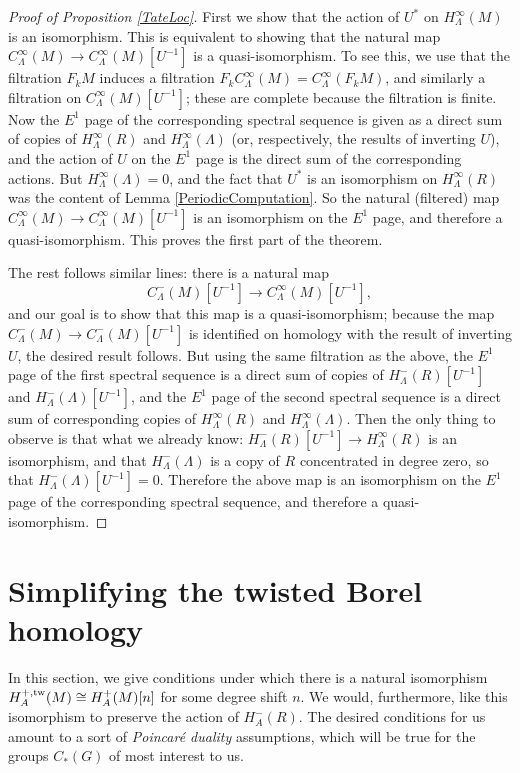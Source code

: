 \documentclass{memo-l}
\theoremstyle{definition}
\theoremstyle{remark}
\numberwithin{section}{chapter}
\numberwithin{equation}{chapter}
\begin{document}
\begin{proof}[Proof of Proposition \ref{TateLoc}]First we show that the action of $U^*$ on $H^\infty_\Lambda(M)$ is an isomorphism. This is equivalent to showing that the natural map $C^\infty_\Lambda(M) \to C^\infty_\Lambda(M)[U^{-1}]$ is a quasi-isomorphism. To see this, we use that the filtration $F_k M$ induces a filtration $F_k C^\infty_\Lambda(M) = C^\infty_\Lambda(F_k M)$, and similarly a filtration on $C^\infty_\Lambda(M)[U^{-1}]$; these are complete because the filtration is finite. Now the $E^1$ page of the corresponding spectral sequence is given as a direct sum of copies of $H^\infty_\Lambda(R)$ and $H^\infty_\Lambda(\Lambda)$ (or, respectively, the results of inverting $U$), and the action of $U$ on the $E^1$ page is the direct sum of the corresponding actions. But $H^\infty_\Lambda(\Lambda) = 0$, and the fact that $U^*$ is an isomorphism on $H^\infty_\Lambda(R)$ was the content of Lemma \ref{PeriodicComputation}. So the natural (filtered) map $C^\infty_\Lambda(M) \to C^\infty_\Lambda(M)[U^{-1}]$ is an isomorphism on the $E^1$ page, and therefore a quasi-isomorphism. This proves the first part of the theorem.

The rest follows similar lines: there is a natural map $$C^-_\Lambda(M)[U^{-1}] \to C^\infty_\Lambda(M)[U^{-1}],$$ and our goal is to show that this map is a quasi-isomorphism; because the map $C^-_\Lambda(M) \to C^-_\Lambda(M)[U^{-1}]$ is identified on homology with the result of inverting $U$, the desired result follows. But using the same filtration as the above, the $E^1$ page of the first spectral sequence is a direct sum of copies of $H^-_\Lambda(R)[U^{-1}]$ and $H^-_\Lambda(\Lambda)[U^{-1}]$, and the $E^1$ page of the second spectral sequence is a direct sum of corresponding copies of $H^\infty_\Lambda(R)$ and $H^\infty_\Lambda(\Lambda)$. Then the only thing to observe is that what we already know: $H^-_\Lambda(R)[U^{-1}] \to H^\infty_\Lambda(R)$ is an isomorphism, and that $H^-_\Lambda(\Lambda)$ is a copy of $R$ concentrated in degree zero, so that $H^-_\Lambda(\Lambda)[U^{-1}] = 0$. Therefore the above map is an isomorphism on the $E^1$ page of the corresponding spectral sequence, and therefore a quasi-isomorphism.\end{proof}

\section{Simplifying the twisted Borel homology}\label{borel}
In this section, we give conditions under which there is a natural isomorphism $H^{+,\textup{tw}}_A(M) \cong H^+_A(M)[n]$ for some degree shift $n$. We would, furthermore, like this isomorphism to preserve the action of $H^-_A(R)$. The desired conditions for us amount to a sort of \emph{Poincar\'e duality} assumptions, which will be true for the groups $C_*(G)$ of most interest to us. 
\end{document}
